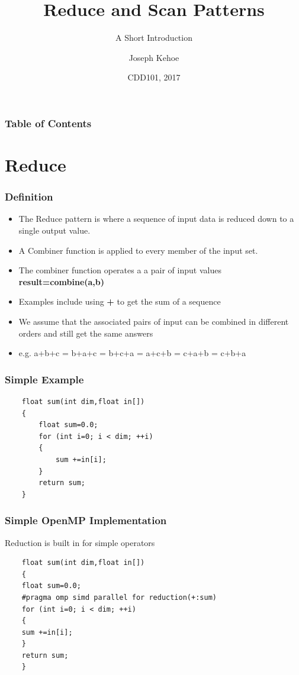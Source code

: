 \documentclass{beamer}
\title[Reduce and Scan] %
{Reduce and Scan Patterns}
\subtitle{A Short Introduction}
\author[Dr. Joseph Kehoe] %
{Joseph Kehoe\inst{1}}
\institute[IT Carlow] %
{
	\inst{1}%
	Department of Computing and Networking\\
	Institute of Technology Carlow
}
\date[ITC 2017] %
{CDD101, 2017}
\begin{document}
 
\frame{\titlepage}
 
 
 
 \begin{frame}
 	\frametitle{Table of Contents}
 	\tableofcontents
 \end{frame}
 
 
 \section{Reduce}
\begin{frame}
\frametitle{Definition}

\begin{itemize}
	\item The Reduce pattern is where a sequence of input data is reduced down to a single output value.
	\item A Combiner function is applied to every member of the input set.
	\item The combiner function operates a a pair of input values \textbf{result=combine(a,b)}
	\item Examples include using \textbf{+} to get the sum of a sequence
	\item We assume that the associated pairs of input can be combined in different orders and still get the same answers
	\item e.g.  a+b+c = b+a+c = b+c+a = a+c+b = c+a+b = c+b+a
\end{itemize}
\end{frame}


 \begin{frame}[fragile=singleslide]
 	\frametitle{Simple Example}
\begin{lstlisting}
 	float sum(int dim,float in[])
 	{
	 	float sum=0.0;
 		for (int i=0; i < dim; ++i)
 		{
 			sum +=in[i];
 		}
 		return sum;
 	}
 \end{lstlisting}
 \end{frame}
  \begin{frame}[fragile=singleslide]
  	\frametitle{Simple OpenMP Implementation}
  	Reduction is built in for simple operators
  	\begin{lstlisting}
  	float sum(int dim,float in[])
  	{
  	float sum=0.0;
  	#pragma omp simd parallel for reduction(+:sum)
  	for (int i=0; i < dim; ++i)
  	{
  	sum +=in[i];
  	}
  	return sum;
  	}
  	\end{lstlisting}
  \end{frame}
\end{document}
